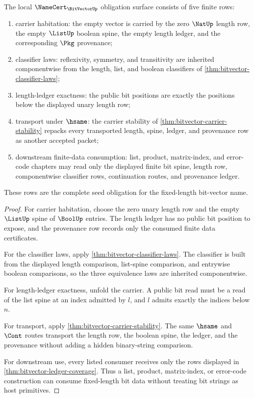 \begin{theorem}\label{thm:bitvector-namecert-obligation-surface}
The local $\NameCert_{\BitVectorUp}$ obligation surface consists of five
finite rows:
\begin{enumerate}
\item carrier habitation: the empty vector is carried by the zero $\NatUp$
length row, the empty $\ListUp$ boolean spine, the empty length ledger, and the
corresponding $\Pkg$ provenance;
\item classifier laws: reflexivity, symmetry, and transitivity are inherited
componentwise from the length, list, and boolean classifiers of
\autoref{thm:bitvector-classifier-laws};
\item length-ledger exactness: the public bit positions are exactly the
positions below the displayed unary length row;
\item transport under $\hsame$: the carrier stability of
\autoref{thm:bitvector-carrier-stability} repacks every transported length,
spine, ledger, and provenance row as another accepted packet;
\item downstream finite-data consumption: list, product, matrix-index, and
error-code chapters may read only the displayed finite bit spine, length row,
componentwise classifier rows, continuation routes, and provenance ledger.
\end{enumerate}
These rows are the complete seed obligation for the fixed-length bit-vector
name.
\end{theorem}
\begin{proof}
For carrier habitation, choose the zero unary length row and the empty
$\ListUp$ spine of $\BoolUp$ entries. The length ledger has no public bit
position to expose, and the provenance row records only the consumed finite
data certificates.

For the classifier laws, apply \autoref{thm:bitvector-classifier-laws}. The
classifier is built from the displayed length comparison, list-spine
comparison, and entrywise boolean comparisons, so the three equivalence laws
are inherited componentwise.

For length-ledger exactness, unfold the carrier. A public bit read must be a
read of the list spine at an index admitted by $l$, and $l$ admits exactly the
indices below $n$.

For transport, apply \autoref{thm:bitvector-carrier-stability}. The same
$\hsame$ and $\Cont$ routes transport the length row, the boolean spine, the
ledger, and the provenance without adding a hidden binary-string comparison.

For downstream use, every listed consumer receives only the rows displayed in
\autoref{thm:bitvector-ledger-coverage}. Thus a list, product, matrix-index,
or error-code construction can consume fixed-length bit data without treating
bit strings as host primitives.
\end{proof}

